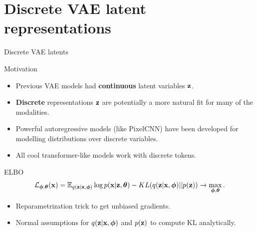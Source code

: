 \section{Discrete VAE latent representations}
\begin{frame}{Discrete VAE latents}
	\begin{block}{Motivation}
		\begin{itemize}
			\item Previous VAE models had \textbf{continuous} latent variables $\mathbf{z}$.
			\item \textbf{Discrete} representations $\mathbf{z}$ are potentially a more natural fit for many of the modalities.
			\item Powerful autoregressive models (like PixelCNN) have been developed for modelling distributions over discrete variables.
			\item All cool transformer-like models work with discrete tokens.
		\end{itemize}
	\end{block}
	\begin{block}{ELBO}
		\vspace{-0.3cm}
		\[
		\mathcal{L}_{\boldsymbol{\phi}, \boldsymbol{\theta}}(\mathbf{x})  = \mathbb{E}_{q(\mathbf{z} | \mathbf{x}, \boldsymbol{\phi})} \log p(\mathbf{x} | \mathbf{z} , \boldsymbol{\theta}) - KL(q(\mathbf{z}| \mathbf{x}, \boldsymbol{\phi}) || p(\mathbf{z})) \rightarrow \max_{\boldsymbol{\phi}, \boldsymbol{\theta}}.
		\]
		\vspace{-0.5cm}
	\end{block}
	\begin{itemize}
		\item Reparametrization trick to get unbiased gradients.
		\item Normal assumptions for $q(\mathbf{z} | \mathbf{x}, \boldsymbol{\phi})$ and $p(\mathbf{z})$ to compute KL analytically.
	\end{itemize}
\end{frame}
